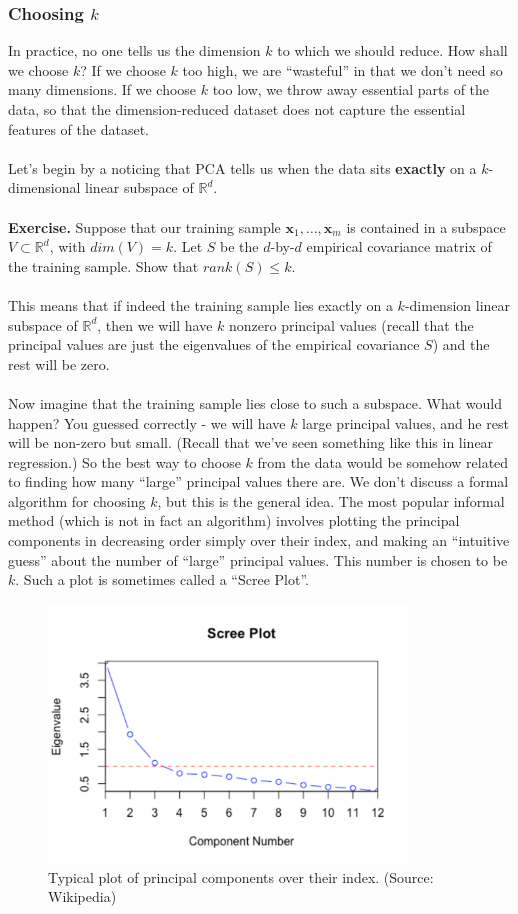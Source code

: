 \documentclass[11pt]{article}
\newcommand{\R}{\ensuremath{\mathbb{R}}}
\newcommand{\V}[1]{\mathbf{#1}}
\begin{document}
\subsubsection{Choosing $k$}

In practice, no one tells us the dimension $k$ to which we should reduce. 
How shall we choose $k$? If we choose $k$ too high, we are ``wasteful'' in that
we don't need so many dimensions. If we choose $k$ too low, we throw away
essential parts of the data, so that the dimension-reduced dataset does not
capture the essential features of the dataset.
\\~\\
Let's begin by a noticing that PCA tells us when the data sits 
{\bf exactly} on a
$k$-dimensional linear subspace of $\R^d$. 
\\~\\
{\bf Exercise.} 
Suppose that our training sample $\V{x}_1,\ldots,\V{x}_m$ is contained in a
subspace $V\subset \R^d$, with $dim(V)=k$. Let $S$ be the $d$-by-$d$
 empirical covariance
 matrix of the training sample. Show that $rank(S)\leq k$.
\\~\\ 
 This means that if indeed the training sample lies exactly on a $k$-dimension
 linear subspace of $\R^d$, then we will have $k$ nonzero principal values
 (recall that the principal values are just the eigenvalues of the empirical
 covariance $S$) and the rest will be zero. 
\\~\\
Now imagine that the training sample lies close to such a subspace. What would
happen? You guessed correctly - we will have $k$ large principal values, and he
rest will be non-zero but small. (Recall that we've seen something like this in
linear regression.) So the best way to choose $k$ from the data would be somehow
related to finding how many ``large'' principal values there are. We don't
discuss a formal algorithm for choosing $k$, but this is the general idea.
The most popular informal method (which is not in fact an algorithm) involves
plotting the principal components in decreasing order simply over their index,
and making an ``intuitive guess'' about the number of ``large'' principal
values. This number is chosen to be $k$. Such a plot is sometimes called a
``Scree Plot''. 
\begin{figure}[H]
      \centering
      \includegraphics[height=2.7in]{screeplot.pdf}        
      \caption{Typical plot of principal components over their index. (Source:
      Wikipedia)}
    \end{figure}
\end{document}

